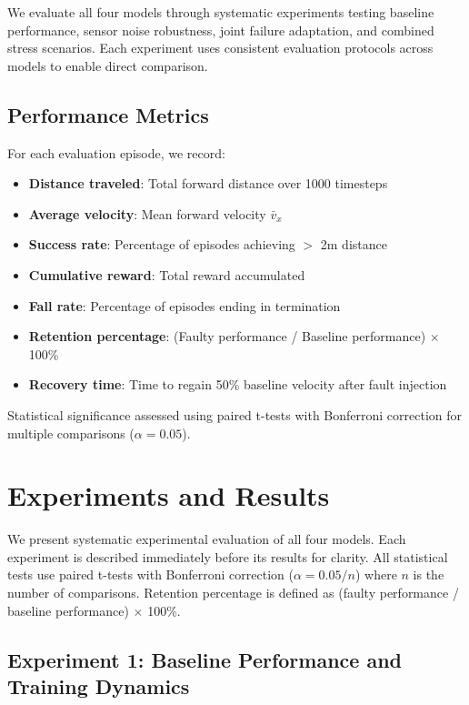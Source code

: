 \documentclass[conference]{IEEEtran}
\begin{document}
We evaluate all four models through systematic experiments testing baseline performance, sensor noise robustness, joint failure adaptation, and combined stress scenarios. Each experiment uses consistent evaluation protocols across models to enable direct comparison.

\subsection{Performance Metrics}

For each evaluation episode, we record:

\begin{itemize}
    \item \textbf{Distance traveled}: Total forward distance over 1000 timesteps
    \item \textbf{Average velocity}: Mean forward velocity $\bar{v}_x$
    \item \textbf{Success rate}: Percentage of episodes achieving $>$ 2m distance
    \item \textbf{Cumulative reward}: Total reward accumulated
    \item \textbf{Fall rate}: Percentage of episodes ending in termination
    \item \textbf{Retention percentage}: (Faulty performance / Baseline performance) $\times$ 100\%
    \item \textbf{Recovery time}: Time to regain 50\% baseline velocity after fault injection
\end{itemize}

Statistical significance assessed using paired t-tests with Bonferroni correction for multiple comparisons ($\alpha = 0.05$).

\section{Experiments and Results}
\label{sec:results}

We present systematic experimental evaluation of all four models. Each experiment is described immediately before its results for clarity. All statistical tests use paired t-tests with Bonferroni correction ($\alpha = 0.05/n$) where $n$ is the number of comparisons. Retention percentage is defined as (faulty performance / baseline performance) $\times$ 100\%.

\subsection{Experiment 1: Baseline Performance and Training Dynamics}
\end{document}
